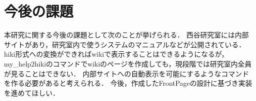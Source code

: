 \section{今後の課題}
本研究に関する今後の課題として次のことが挙げられる．
西谷研究室には内部サイトがあり，研究室内で使うシステムのマニュアルなどが公開されている．
hiki形式への変換ができればwikiで表示することはできるようになるが，
my\_help2hikiのコマンドでwikiのページを作成しても，現段階では研究室内全員が見ることはできない．
内部サイトへの自動表示を可能にするようなコマンドを作る必要があると考えられる．
今後，作成したFrontPageの設計に基づき実装を進めてほしい．